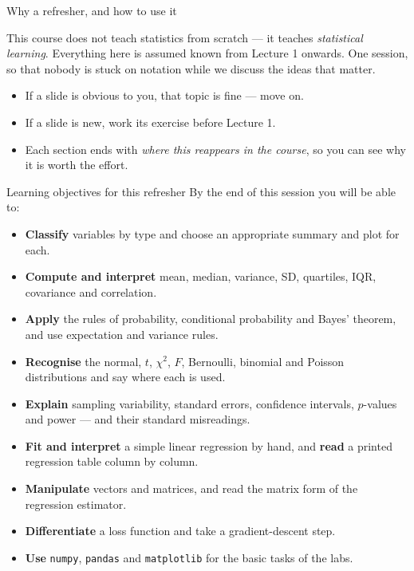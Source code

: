 \documentclass[aspectratio=169,11pt]{beamer}
\begin{document}
\begin{frame}{Why a refresher, and how to use it}
  \begin{takeaway}
    This course does not teach statistics from scratch --- it teaches
    \emph{statistical learning}. Everything here is assumed known from
    Lecture 1 onwards. One session, so that nobody is stuck on notation
    while we discuss the ideas that matter.
  \end{takeaway}
  \begin{readme}
    \begin{itemize}
      \item If a slide is obvious to you, that topic is fine --- move on.
      \item If a slide is new, work its exercise before Lecture 1.
      \item Each section ends with \emph{where this reappears in the course},
            so you can see why it is worth the effort.
    \end{itemize}
  \end{readme}
\end{frame}

\begin{frame}{Learning objectives for this refresher}
  By the end of this session you will be able to:
  \begin{itemize}
    \item \textbf{Classify} variables by type and choose an appropriate summary
          and plot for each.
    \item \textbf{Compute and interpret} mean, median, variance, SD, quartiles,
          IQR, covariance and correlation.
    \item \textbf{Apply} the rules of probability, conditional probability and
          Bayes' theorem, and use expectation and variance rules.
    \item \textbf{Recognise} the normal, $t$, $\chi^2$, $F$, Bernoulli, binomial
          and Poisson distributions and say where each is used.
    \item \textbf{Explain} sampling variability, standard errors, confidence
          intervals, $p$-values and power --- and their standard misreadings.
    \item \textbf{Fit and interpret} a simple linear regression by hand, and
          \textbf{read} a printed regression table column by column.
    \item \textbf{Manipulate} vectors and matrices, and read the matrix form of
          the regression estimator.
    \item \textbf{Differentiate} a loss function and take a gradient-descent step.
    \item \textbf{Use} \texttt{numpy}, \texttt{pandas} and \texttt{matplotlib} for
          the basic tasks of the labs.
  \end{itemize}
\end{frame}
\end{document}
